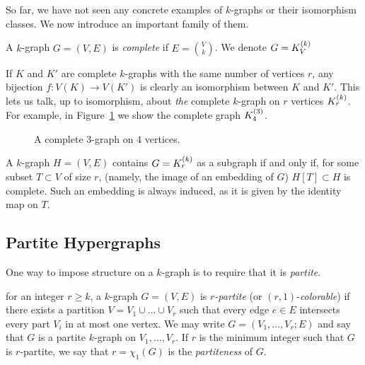 So far, we have not seen any concrete examples of $k$-graphs or their isomorphism classes.
We now introduce an important family of them.

\begin{definition} \label{def:complete}
    A $k$-graph $G = (V, E)$ is \emph{complete} if $E = \binom{V}{k}$.
    We denote $G = K^{(k)}_{V}$
\end{definition}

If $K$ and $K'$ are complete $k$-graphs with the same number of vertices $r$,
any bijection $f: V(K) \to V(K')$ is clearly an isomorphism between $K$ and $K'$.
This lets us talk, up to isomorphism, about \emph{the} complete $k$-graph on $r$ vertices $K^{(k)}_{r}$.
For example, in Figure~\ref{fig:complete_kgraph} we show the complete graph $K^{(3)}_{4}$.

\begin{figure}[htbp]
    \centering
    
    \caption{A complete $3$-graph on $4$ vertices.}
    \label{fig:complete_kgraph}
\end{figure}

\begin{remark}
    A $k$-graph $H = (V, E)$ contains $G = K^{(k)}_{r}$ as a subgraph if and only if,
    for some subset $T \subset V$ of size $r$, (namely, the image of an embedding of $G$)
    $H[T] \subset H$ is complete.
    Such an embedding is always induced, as it is given by the identity map on $T$.
\end{remark}

\subsection{Partite Hypergraphs}\label{subsec:partite}

One way to impose structure on a $k$-graph is to require that it is \emph{partite}.

\begin{definition} \label{def:partite}
    for an integer $r \geq k$, a $k$-graph $G = (V, E)$ is \emph{$r$-partite}
    (or $(r, 1)$-\emph{colorable})
    if there exists a partition $V = V_1 \cup \dots \cup V_r$
    such that every edge $e \in E$ intersects every part $V_i$ in at most one vertex.
    We may write $G = (V_1, \dots, V_r; E)$ and say that
    $G$ is a partite $k$-graph on $V_1, \dots, V_r$.
    If $r$ is the minimum integer such that $G$ is $r$-partite,
    we say that $r = \chi_{1}(G)$ is the \emph{partiteness} of $G$.
\end{definition}

